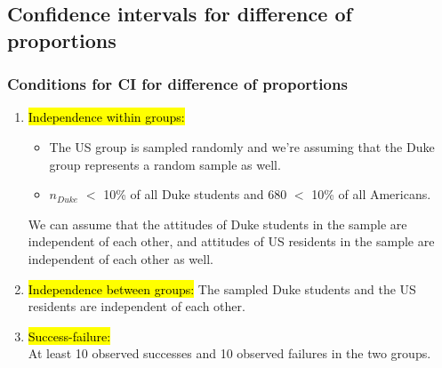 
\subsection{Confidence intervals for difference of proportions}


\begin{frame}
\frametitle{Conditions for CI for difference of proportions}

\begin{enumerate}

\item \hl{Independence within groups: }
\begin{itemize}
\item The US group is sampled randomly and we're assuming that the Duke group represents a random sample as well.
\pause
\item $n_{Duke}$ $<$ 10\% of all Duke students and 680 $<$ 10\% of all Americans.
\end{itemize}
\pause
We can assume that the attitudes of Duke students in the sample are independent of each other, and attitudes of US residents in the sample are independent of each other as well.

\pause

\item \hl{Independence between groups: }
The sampled Duke students and the US residents are independent of each other.

\pause

\item \hl{Success-failure:} \\
At least 10 observed successes and 10 observed failures in the two groups.

\end{enumerate}

\end{frame}


